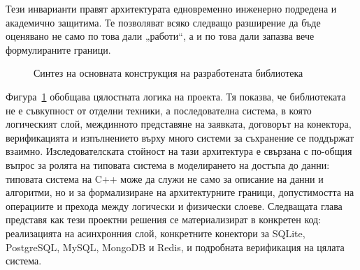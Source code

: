 Тези инварианти правят архитектурата едновременно инженерно подредена и академично защитима. Те позволяват всяко следващо разширение да бъде оценявано не само по това дали „работи“, а и по това дали запазва вече формулираните граници.

\begin{figure}[H]
\centering
{}
\caption{Синтез на основната конструкция на разработената библиотека}
\label{fig:thesis_synthesis}
\end{figure}

Фигура~\ref{fig:thesis_synthesis} обобщава цялостната логика на проекта. Тя показва, че библиотеката не е съвкупност от отделни техники, а последователна система, в която логическият слой, междинното представяне на заявката, договорът на конектора, верификацията и изпълнението върху много системи за съхранение се поддържат взаимно. Изследователската стойност на тази архитектура е свързана с по-общия въпрос за ролята на типовата система в моделирането на достъпа до данни: типовата система на C++ може да служи не само за описание на данни и алгоритми, но и за формализиране на архитектурните граници, допустимостта на операциите и прехода между логически и физически слоеве. Следващата глава представя как тези проектни решения се материализират в конкретен код: реализацията на асинхронния слой, конкретните конектори за SQLite, PostgreSQL, MySQL, MongoDB и Redis, и подробната верификация на цялата система.
